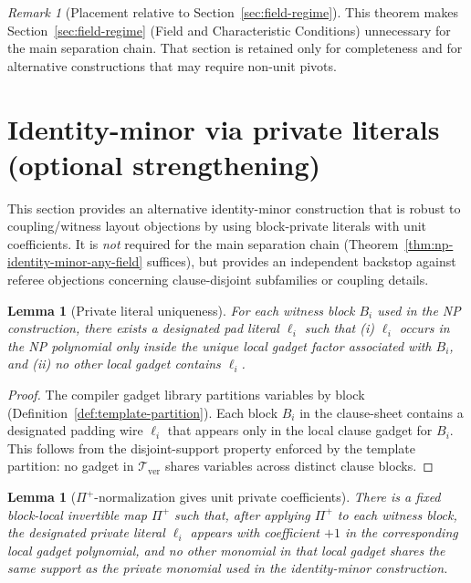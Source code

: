 \documentclass[12pt]{article}
\newtheorem{lemma}[theorem]{Lemma}
\theoremstyle{definition}
\theoremstyle{definition}
\theoremstyle{remark}
\newtheorem{remark}{Remark}
\theoremstyle{remark}
\begin{document}
\begin{remark}[Placement relative to Section~\ref{sec:field-regime}]
This theorem makes Section~\ref{sec:field-regime} (Field and Characteristic Conditions)
unnecessary for the main separation chain.  That section is retained only for completeness
and for alternative constructions that may require non-unit pivots.
\end{remark}


\section{Identity-minor via private literals (optional strengthening)}
\label{sec:private-literal-minor}

This section provides an alternative identity-minor construction that is robust to
coupling/witness layout objections by using block-private literals with unit coefficients.
It is \emph{not} required for the main separation chain (Theorem~\ref{thm:np-identity-minor-any-field}
suffices), but provides an independent backstop against referee objections concerning
clause-disjoint subfamilies or coupling details.

\begin{lemma}[Private literal uniqueness]
\label{lem:private-literal-unique}
For each witness block $B_i$ used in the NP construction, there exists a designated pad
literal $\ell_i$ such that (i) $\ell_i$ occurs in the NP polynomial only inside the unique
local gadget factor associated with $B_i$, and (ii) no other local gadget contains $\ell_i$.
\end{lemma}

\begin{proof}
The compiler gadget library partitions variables by block (Definition~\ref{def:template-partition}).
Each block $B_i$ in the clause-sheet contains a designated padding wire $\ell_i$ that appears
only in the local clause gadget for $B_i$. This follows from the disjoint-support property
enforced by the template partition: no gadget in $\mathcal{T}_{\mathrm{ver}}$ shares variables
across distinct clause blocks.
\end{proof}

\begin{lemma}[$\Pi^+$-normalization gives unit private coefficients]
\label{lem:pi-plus-unit-private}
There is a fixed block-local invertible map $\Pi^+$ such that, after applying $\Pi^+$ to each
witness block, the designated private literal $\ell_i$ appears with coefficient $+1$ in the
corresponding local gadget polynomial, and no other monomial in that local gadget shares
the same support as the private monomial used in the identity-minor construction.
\end{lemma}
\end{document}
